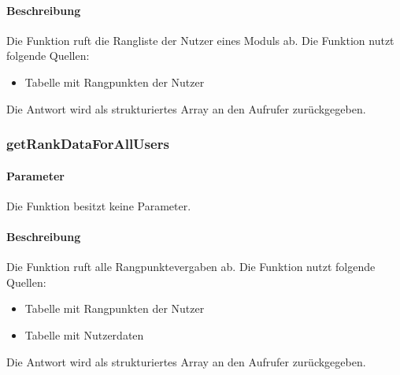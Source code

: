 \paragraph{Beschreibung} Die Funktion ruft die Rangliste der Nutzer eines Moduls ab. Die Funktion nutzt folgende Quellen:
\begin{itemize}
	\item Tabelle mit Rangpunkten der Nutzer
\end{itemize}
Die Antwort wird als strukturiertes Array an den Aufrufer zurückgegeben.
\subsubsection{getRankDataForAllUsers}
\paragraph{Parameter} Die Funktion besitzt keine Parameter.
\paragraph{Beschreibung} Die Funktion ruft alle Rangpunktevergaben ab. Die Funktion nutzt folgende Quellen:
\begin{itemize}
	\item Tabelle mit Rangpunkten der Nutzer
	\item Tabelle mit Nutzerdaten
\end{itemize}
Die Antwort wird als strukturiertes Array an den Aufrufer zurückgegeben.
